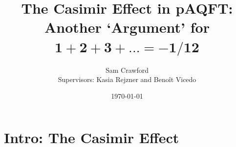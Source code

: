 \documentclass[pdf, fleqn, compress, handout]{beamer}
\title[Graduate Research Symposium 2020]{The Casimir Effect in pAQFT: \\
\large Another `Argument' for $\boldsymbol{1 + 2 + 3 + ... = - 1/12}$}
\author[Sam Crawford]{Sam Crawford\\
Supervisors: Kasia Rejzner and Beno\^it Vicedo}
\date{\today}
\begin{document}
\begin{nonavigation}

\begin{frame}
    \titlepage
\end{frame}

\end{nonavigation}

\section{Intro: The Casimir Effect}
\end{document}
